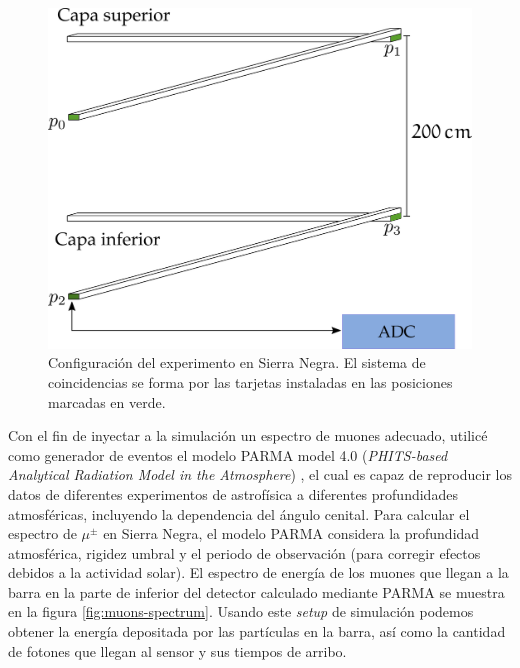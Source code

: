 \begin{figure}
        \centering
        \includegraphics[width=\textwidth]{muons-experiment-0.pdf}
        \caption{Configuración del experimento en Sierra Negra. El sistema de coincidencias se forma por las tarjetas instaladas en las posiciones marcadas en verde.}
        \label{fig:muons-experiment-0}
\end{figure}

Con el fin de inyectar a la simulación un espectro de muones adecuado, utilicé como generador de eventos el modelo PARMA model 4.0 (\emph{PHITS-based Analytical Radiation Model in the Atmosphere}) \cite{sato15,sato16}, el cual es capaz de reproducir los datos de diferentes experimentos de astrofísica a diferentes profundidades atmosféricas, incluyendo la dependencia del ángulo cenital. Para calcular el espectro de $\mu^{\pm}$ en Sierra Negra, el modelo PARMA considera la profundidad atmosférica, rigidez umbral y el periodo de observación (para corregir efectos debidos a la actividad solar). El espectro de energía de los muones que llegan a la barra en la parte de inferior del detector calculado mediante PARMA se muestra en la figura \ref{fig:muons-spectrum}. Usando este \emph{setup} de simulación podemos obtener la energía depositada por las partículas en la barra, así como la cantidad de fotones que llegan al sensor y sus tiempos de arribo.


